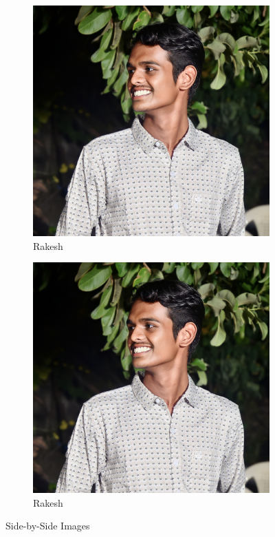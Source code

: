 \documentclass{article}
\begin{document}
	\begin{figure}[h]
		\centering
		\begin{subfigure}[b]{0.45\textwidth}
			\centering
			\includegraphics[width=\linewidth]{1711864646001.jpg}
			\caption{Rakesh}
			\label{fig:image1}
		\end{subfigure}
		\hfill
		\begin{subfigure}[b]{0.45\textwidth}
		\centering
		\includegraphics[width=\linewidth]{1711864646001.jpg}
		\caption{Rakesh}
		\label{fig:image2}
	\end{subfigure}
	\caption{Side-by-Side Images}
	
	\end{figure}
\end{document}
